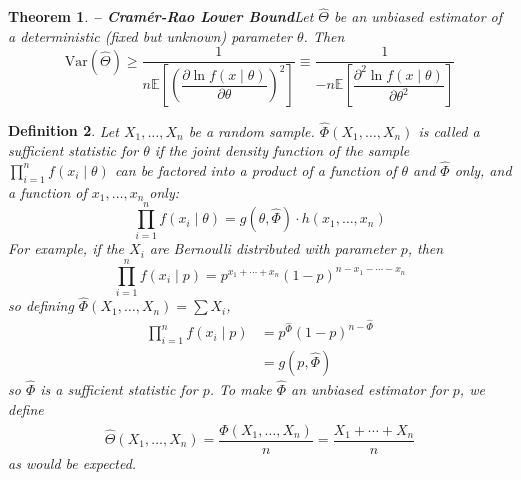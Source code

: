 \documentclass[1pt]{report}
\newtheorem{thm}{Theorem}[chapter]
\newtheorem{defn}[thm]{Definition}
\newcommand{\<}{\langle}
\renewcommand{\>}{\rangle}
\newcommand{\del}{\partial}
\newcommand{\E}{\mathbb{E}}
\begin{document}
\begin{thm}\textbf{ -- Cram{\'e}r-Rao Lower Bound}\label{thm:cramerrao}
Let $\hat\Theta$ be an unbiased estimator of a deterministic (fixed but unknown) parameter $\theta$. Then
$$\text{Var}(\hat\Theta) \geq \dfrac{1}{n \E\left[\left(\dfrac{\del\ln f(x\mid \theta)}{\del \theta}\right)^2\right]} \equiv \dfrac{1}{-n\E\left[\dfrac{\del^2 \ln f(x\mid \theta)}{\del \theta^2}\right]}$$
\end{thm}
\begin{defn}\label{def:sufficiency}
Let $X_1, \dots, X_n$ be a random sample. $\hat\Phi(X_1,\dots,X_n)$ is called a \emph{sufficient statistic} for $\theta$ if the joint density function of the sample $\prod\limits_{i=1}^n f(x_i \mid \theta)$ can be factored into a product of a function of $\theta$ and $\hat\Phi$ only, and a function of $x_1,\dots,x_n$ only:
$$\prod\limits_{i=1}^n f(x_i \mid \theta) = g(\theta, \hat\Phi) \cdot h(x_1,\dots, x_n)$$
For example, if the $X_i$ are Bernoulli distributed with parameter $p$, then 
$$\prod\limits_{i=1}^n f(x_i \mid p) = p^{x_1 + \cdots + x_n} (1-p)^{n - x_1 - \cdots -x_n}$$
so defining $\hat\Phi(X_1, \dots, X_n) = \sum X_i$,
\begin{align*}
\prod\limits_{i=1}^n f(x_i \mid p) &= p^{\hat\Phi} (1-p)^{n - \hat\Phi} \\
& = g(p, \hat \Phi)
\end{align*}
so $\hat\Phi$ is a sufficient statistic for $p$. To make $\hat\Phi$ an unbiased estimator for $p$, we define
$$\hat\Theta(X_1, \dots, X_n) = \frac{\hat\Phi(X_1,\dots, X_n)}{n} = \frac{X_1 + \cdots + X_n}{n}$$
as would be expected.
\end{defn}
\end{document}

